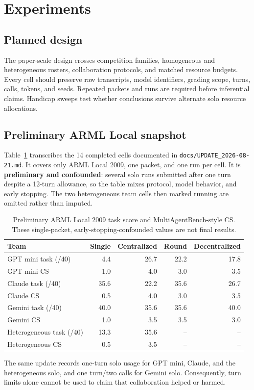\section{Experiments}
\subsection{Planned design}
The paper-scale design crosses competition families, homogeneous and
heterogeneous rosters, collaboration protocols, and matched resource budgets.
Every cell should preserve raw transcripts, model identifiers, grading scope,
turns, calls, tokens, and seeds. Repeated packets and runs are required before
inferential claims. Handicap sweeps test whether conclusions survive alternate
solo resource allocations.

\subsection{Preliminary ARML Local snapshot}
Table~\ref{tab:arml-prelim} transcribes the 14 completed cells documented in
\texttt{docs/UPDATE\_2026-08-21.md}. It covers only ARML Local 2009, one packet,
and one run per cell. It is \textbf{preliminary and confounded}: several solo
runs submitted after one turn despite a 12-turn allowance, so the table mixes
protocol, model behavior, and early stopping. The two heterogeneous team cells
then marked running are omitted rather than imputed.

\begin{table}[t]
\centering
\small
\begin{tabular}{lrrrr}
\toprule
Team & Single & Centralized & Round & Decentralized \\
\midrule
GPT mini task (/40) & 4.4 & 26.7 & 22.2 & 17.8 \\
GPT mini CS & 1.0 & 4.0 & 3.0 & 3.5 \\
Claude task (/40) & 35.6 & 22.2 & 35.6 & 26.7 \\
Claude CS & 0.5 & 4.0 & 3.0 & 3.5 \\
Gemini task (/40) & 40.0 & 35.6 & 35.6 & 40.0 \\
Gemini CS & 1.0 & 3.5 & 3.5 & 3.0 \\
Heterogeneous task (/40) & 13.3 & 35.6 & -- & -- \\
Heterogeneous CS & 0.5 & 3.5 & -- & -- \\
\bottomrule
\end{tabular}
\caption{Preliminary ARML Local 2009 task score and MultiAgentBench-style CS.
These single-packet, early-stopping-confounded values are not final results.}
\label{tab:arml-prelim}
\end{table}

The same update records one-turn solo usage for GPT mini, Claude, and the
heterogeneous solo, and one turn/two calls for Gemini solo. Consequently, turn
limits alone cannot be used to claim that collaboration helped or harmed.
